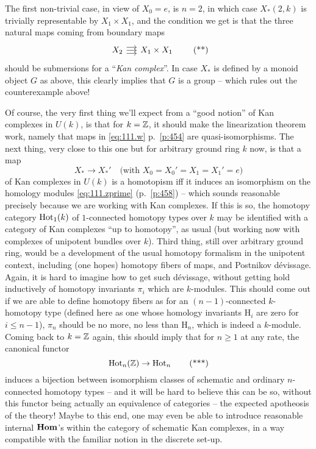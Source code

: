 The first non-trivial case, in view of $X_0=e$, is $n=2$, in which
case $X_*(2,k)$ is trivially representable by $X_1\times X_1$, and the
condition we get is that the three natural maps coming from boundary
maps
\begin{equation}
  \label{eq:112.starstar}
  \begin{tikzcd}[sep=small]
    X_2 \ar[r]\ar[r,shift left=1.5]\ar[r,shift right=1.5] & X_1\times X_1
  \end{tikzcd}\tag{**}
\end{equation}
should be submersions for a ``\emph{Kan complex}''. In
case $X_*$ is defined by a monoid object $G$ as above, this clearly
implies that $G$ is a group -- which rules out the counterexample
above!

Of course, the very first thing we'll expect from a ``good notion'' of
Kan complexes in $U(k)$, is that for $k={\mathbb{Z}}$, it should make the
linearization theorem work, namely that maps in \eqref{eq:111.w}
p.~\ref{p:454} are quasi-isomorphisms. The next thing, very close to
this one but for arbitrary ground ring $k$ now, is that a map
\[X_* \to X_*'\quad \text{(with $X_0=X_0'=X_1=X_1'=e$)}\]
of Kan complexes in $U(k)$ is a homotopism if{f} it induces an
isomorphism on the homology modules \eqref{eq:111.zprime}
(p.~\ref{p:458}) -- which sounds reasonable precisely because we are
working with Kan complexes. If this is so, the homotopy category
$\operatorname{Hot}_1(k)$ of $1$-connected homotopy types over $k$ may be
identified with a category of Kan complexes ``up to homotopy'', as
usual (but working now with complexes of unipotent bundles over
$k$). Third thing, still over arbitrary ground ring, would be a
development of the usual homotopy formalism in the unipotent context,
including (one hopes) homotopy fibers of maps, and Postnikov
dévissage. Again, it is hard to imagine how to get such dévissage,
without getting hold inductively of homotopy invariants $\pi_i$ which
are $k$-modules. This should come out if we are able to define
homotopy fibers as for an $(n-1)$-connected $k$-homotopy type (defined
here as one whose homology invariants $\mathrm H_i$ are zero for $i\le
n-1$), $\pi_n$ should be no more, no less than $\mathrm H_n$, which is
indeed a $k$-module. Coming back to $k={\mathbb{Z}}$ again, this should imply
that for $n\ge1$ at any rate, the canonical functor
\begin{equation}
  \label{eq:112.starstarstar}
  \operatorname{Hot}_n({\mathbb{Z}})\to\operatorname{Hot}_n\tag{***}
\end{equation}
induces a bijection between isomorphism classes of schematic and
ordinary $n$-connected homotopy types -- and it will be hard to
believe this can be so, without this functor being actually an
equivalence of categories -- the expected apotheosis of the theory!
Maybe to this end, one may even be able to introduce reasonable
internal $\operatorname{\mathbf{Hom}}$'s within the category of schematic Kan complexes, in
a way compatible with the familiar notion in the discrete set-up.

